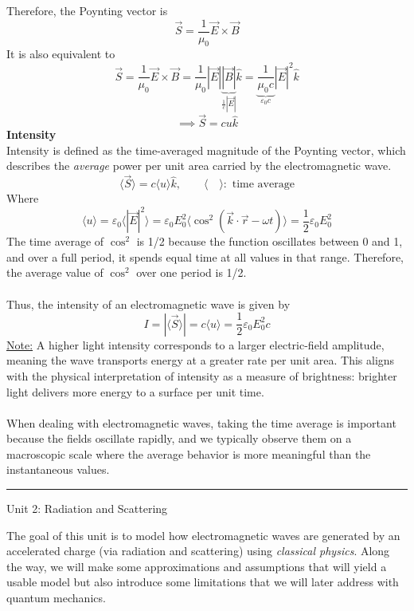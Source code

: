 \documentclass[12pt]{article}
\begin{document}
Therefore, the Poynting vector is
\[\boxed{\vec{S} = \frac{1}{\mu_0} \vec{E} \times \vec{B}}\]
It is also equivalent to 
\[\vec{S} = \frac{1}{\mu_0} \vec{E}\times\vec{B} = \frac{1}{\mu_0} |\vec{E}|\underbrace{|\vec{B}|}_{\frac{1}{c}|\vec{E}|}\hat{k} = \underbrace{\frac{1}{\mu_0 c}}_{\varepsilon_0 c} |\vec{E}|^2 \hat{k}\]
\[\implies \boxed{\vec{S} = cu\hat{k}}\]
\textbf{Intensity}\\
Intensity is defined as the time-averaged magnitude of the Poynting vector, which describes the \textit{average} power per unit area carried by the electromagnetic wave.
\[\langle\vec{S}\rangle = c \langle u \rangle\hat{k}, \qquad \langle\quad\rangle : \text{ time average}\]
Where
\[\langle u \rangle = \varepsilon_0 \langle |\vec{E}|^2 \rangle = \varepsilon_0 E_0^2 \langle \cos^2(\vec{k} \cdot \vec{r} - \omega t) \rangle = \frac{1}{2} \varepsilon_0 E_0^2\]
The time average of $\cos^2$ is 1/2 because the function oscillates between 0 and 1, and over a full period, it spends equal time at all values in that range. Therefore, the average value of $\cos^2$ over one period is 1/2.\\\\
Thus, the intensity of an electromagnetic wave is given by
\[\boxed{I = |\langle\vec{S}\rangle| = c \langle u \rangle=\frac{1}{2} \varepsilon_0 E_0^2 c}\]
\underline{Note:} A higher light intensity corresponds to a larger electric-field amplitude, meaning the wave transports energy at a greater rate per unit area. This aligns with the physical interpretation of intensity as a measure of brightness: brighter light delivers more energy to a surface per unit time.\\\\
When dealing with electromagnetic waves, taking the time average is important because the fields oscillate rapidly, and we typically observe them on a macroscopic scale where the average behavior is more meaningful than the instantaneous values.
\vspace{1em}
\noindent\hrule
\vspace{1em}
\newpage
\begin{center}
   {\LARGE Unit 2: Radiation and Scattering\par} 
\end{center}
The goal of this unit is to model how electromagnetic waves are generated by an accelerated charge (via radiation and scattering) using \textit{classical physics}. Along the way, we will make some approximations and assumptions that will yield a usable model but also introduce some limitations that we will later address with quantum mechanics.
\end{document}
